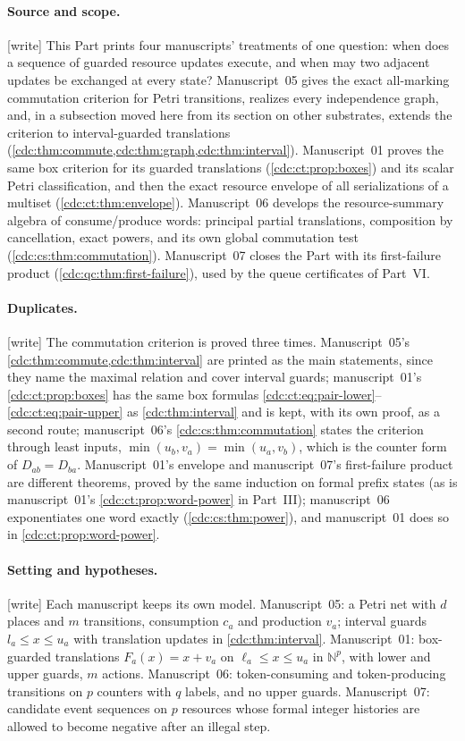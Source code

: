 \documentclass[11pt,a4paper]{article}
\theoremstyle{definition}
\theoremstyle{remark}
\newcommand{\N}{\mathbb N}
\newcommand{\wtag}{\textup{[write]}}%
\begin{document}
\paragraph{Source and scope.} \wtag{} This Part prints four manuscripts' treatments of one question: when does a sequence of guarded resource updates execute, and when may two adjacent updates be exchanged at every state? Manuscript~05 gives the exact all-marking commutation criterion for Petri transitions, realizes every independence graph, and, in a subsection moved here from its section on other substrates, extends the criterion to interval-guarded translations (\cref{cdc:thm:commute,cdc:thm:graph,cdc:thm:interval}). Manuscript~01 proves the same box criterion for its guarded translations (\cref{cdc:ct:prop:boxes}) and its scalar Petri classification, and then the exact resource envelope of all serializations of a multiset (\cref{cdc:ct:thm:envelope}). Manuscript~06 develops the resource-summary algebra of consume/produce words: principal partial translations, composition by cancellation, exact powers, and its own global commutation test (\cref{cdc:cs:thm:commutation}). Manuscript~07 closes the Part with its first-failure product (\cref{cdc:qc:thm:first-failure}), used by the queue certificates of Part~VI.

\paragraph{Duplicates.} \wtag{} The commutation criterion is proved three times. Manuscript~05's \cref{cdc:thm:commute,cdc:thm:interval} are printed as the main statements, since they name the maximal relation and cover interval guards; manuscript~01's \cref{cdc:ct:prop:boxes} has the same box formulas \eqref{cdc:ct:eq:pair-lower}--\eqref{cdc:ct:eq:pair-upper} as \cref{cdc:thm:interval} and is kept, with its own proof, as a second route; manuscript~06's \cref{cdc:cs:thm:commutation} states the criterion through least inputs, $\min(u_b,v_a)=\min(u_a,v_b)$, which is the counter form of $D_{ab}=D_{ba}$. Manuscript~01's envelope and manuscript~07's first-failure product are different theorems, proved by the same induction on formal prefix states (as is manuscript~01's \cref{cdc:ct:prop:word-power} in Part~III); manuscript~06 exponentiates one word exactly (\cref{cdc:cs:thm:power}), and manuscript~01 does so in \cref{cdc:ct:prop:word-power}.

\paragraph{Setting and hypotheses.} \wtag{} Each manuscript keeps its own model. Manuscript~05: a Petri net with $d$ places and $m$ transitions, consumption $c_a$ and production $v_a$; interval guards $l_a\le x\le u_a$ with translation updates in \cref{cdc:thm:interval}. Manuscript~01: box-guarded translations $F_a(x)=x+v_a$ on $\ell_a\le x\le u_a$ in $\N^p$, with lower and upper guards, $m$ actions. Manuscript~06: token-consuming and token-producing transitions on $p$ counters with $q$ labels, and no upper guards. Manuscript~07: candidate event sequences on $p$ resources whose formal integer histories are allowed to become negative after an illegal step.
\end{document}
